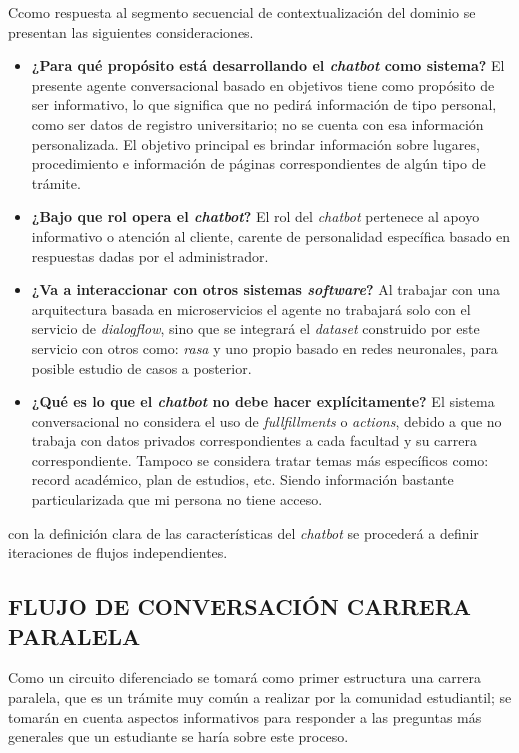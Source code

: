 \documentclass[letter, openright, 12pt]{book}
\begin{document}
\par Ccomo respuesta al segmento secuencial de contextualización del dominio se presentan las siguientes consideraciones.
{\begin{itemize}
\item {\textbf{¿Para qué propósito está desarrollando el {\it chatbot} como sistema?} El presente agente conversacional basado en objetivos tiene como propósito de ser informativo, lo que significa que no pedirá información de tipo personal, como ser datos de registro universitario; no se cuenta con esa información personalizada. El objetivo principal es brindar información sobre lugares, procedimiento e información de páginas correspondientes de algún tipo de trámite. } 

\item {\textbf{¿Bajo que rol opera el {\it chatbot}?} El rol del {\it chatbot} pertenece al apoyo informativo o atención al cliente, carente de personalidad específica basado en respuestas dadas por el administrador. }
 
\item {\textbf{¿Va a interaccionar con otros sistemas {\it software}?} Al trabajar con una arquitectura basada en microservicios el agente no trabajará solo con el servicio de {\it dialogflow}, sino que se integrará el {\it dataset} construido por este servicio con otros como: {\it rasa} y uno propio basado en redes neuronales, para posible estudio de casos a posterior.}
 
\item {\textbf{¿Qué es lo que el {\it chatbot} no debe hacer explícitamente?} El sistema conversacional no considera el uso de {\it fullfillments} o {\it actions}, debido a que no trabaja con datos privados correspondientes a cada facultad y su carrera correspondiente. Tampoco se considera tratar temas más específicos como: record académico, plan de estudios, etc. Siendo información bastante particularizada que mi persona no tiene acceso. } 

\end{itemize}

\par
con la definición clara de las características del {\it chatbot} se procederá a definir iteraciones de flujos independientes. 

\subsection{FLUJO DE CONVERSACIÓN CARRERA PARALELA}
Como un circuito diferenciado se tomará como primer estructura una carrera paralela, que es un trámite muy común a realizar por la comunidad estudiantil; se tomarán en cuenta aspectos informativos para responder a las preguntas más generales que un estudiante se haría sobre este proceso. 

}
\end{document}
